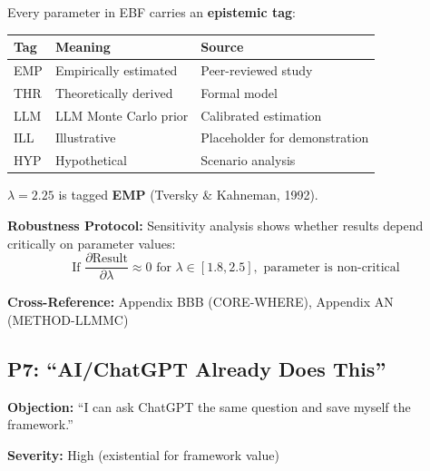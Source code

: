 \begin{axiom}
Every parameter in EBF carries an \textbf{epistemic tag}:

\begin{center}
\begin{tabular}{lll}
\textbf{Tag} & \textbf{Meaning} & \textbf{Source} \\
\midrule
EMP & Empirically estimated & Peer-reviewed study \\
THR & Theoretically derived & Formal model \\
LLM & LLM Monte Carlo prior & Calibrated estimation \\
ILL & Illustrative & Placeholder for demonstration \\
HYP & Hypothetical & Scenario analysis \\
\end{tabular}
\end{center}

$\lambda = 2.25$ is tagged \textbf{EMP} (Tversky \& Kahneman, 1992).

\textbf{Robustness Protocol:} Sensitivity analysis shows whether results
depend critically on parameter values:
\begin{equation}
\text{If } \frac{\partial \text{Result}}{\partial \lambda} \approx 0 \text{ for } \lambda \in [1.8, 2.5], \text{ parameter is non-critical}
\end{equation}
\end{axiom}

\textbf{Cross-Reference:} Appendix BBB (CORE-WHERE), Appendix AN (METHOD-LLMMC)

\subsection{P7: ``AI/ChatGPT Already Does This''}
\label{sec:da-p7}

\begin{tcolorbox}[colback=gray!5!white, colframe=gray!75!black]
\textbf{Objection:} ``I can ask ChatGPT the same question and save myself the framework.''

\textbf{Severity:} High (existential for framework value)
\end{tcolorbox}

